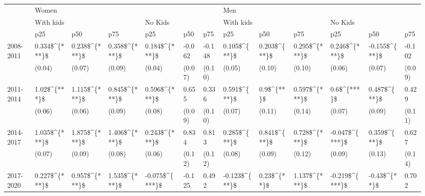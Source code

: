\begin{tabular}{lllllllllllll}
\toprule
{} & \multicolumn{6}{l}{Women} & \multicolumn{6}{l}{Men} \\
{} & \multicolumn{3}{l}{With kids} & \multicolumn{3}{l}{No Kids} & \multicolumn{3}{l}{With kids} & \multicolumn{3}{l}{No Kids} \\
{} &             p25 &             p50 &            p75 &             p25 &     p50 &     p75 &            p25 &            p50 &             p75 &             p25 &            p50 &     p75 \\
\midrule
2008-2011 &   0.334\$\textasciicircum \{***\}\$ &   0.238\$\textasciicircum \{***\}\$ &  0.358\$\textasciicircum \{***\}\$ &   0.184\$\textasciicircum \{***\}\$ &  -0.062 &  -0.148 &   0.105\$\textasciicircum \{**\}\$ &   0.203\$\textasciicircum \{**\}\$ &   0.295\$\textasciicircum \{***\}\$ &   0.246\$\textasciicircum \{***\}\$ &  -0.155\$\textasciicircum \{**\}\$ &  -0.102 \\
          &          (0.04) &          (0.07) &         (0.09) &          (0.04) &  (0.07) &  (0.10) &         (0.05) &         (0.10) &          (0.10) &          (0.06) &         (0.07) &  (0.09) \\
2011-2014 &    1.02\$\textasciicircum \{***\}\$ &   1.115\$\textasciicircum \{***\}\$ &  0.845\$\textasciicircum \{***\}\$ &   0.596\$\textasciicircum \{***\}\$ &   0.655 &   0.336 &   0.591\$\textasciicircum \{**\}\$ &     0.9\$\textasciicircum \{**\}\$ &   0.597\$\textasciicircum \{***\}\$ &     0.6\$\textasciicircum \{***\}\$ &   0.487\$\textasciicircum \{**\}\$ &   0.429 \\
          &          (0.06) &          (0.06) &         (0.09) &          (0.08) &  (0.09) &  (0.10) &         (0.07) &         (0.11) &          (0.14) &          (0.07) &         (0.09) &  (0.11) \\
2014-2017 &   1.035\$\textasciicircum \{***\}\$ &   1.875\$\textasciicircum \{***\}\$ &  1.406\$\textasciicircum \{***\}\$ &   0.243\$\textasciicircum \{***\}\$ &   0.834 &   0.813 &   0.285\$\textasciicircum \{**\}\$ &   0.841\$\textasciicircum \{**\}\$ &   0.728\$\textasciicircum \{***\}\$ &  -0.047\$\textasciicircum \{***\}\$ &   0.359\$\textasciicircum \{**\}\$ &   0.627 \\
          &          (0.07) &          (0.09) &         (0.08) &          (0.06) &  (0.12) &  (0.12) &         (0.08) &         (0.09) &          (0.12) &          (0.09) &         (0.13) &  (0.14) \\
2017-2020 &   0.227\$\textasciicircum \{***\}\$ &   0.957\$\textasciicircum \{***\}\$ &  1.535\$\textasciicircum \{***\}\$ &  -0.075\$\textasciicircum \{***\}\$ &  -0.125 &   0.492 &  -0.123\$\textasciicircum \{**\}\$ &    0.23\$\textasciicircum \{**\}\$ &   1.137\$\textasciicircum \{***\}\$ &  -0.219\$\textasciicircum \{***\}\$ &   -0.43\$\textasciicircum \{**\}\$ &   0.702 \\

\end{tabular}
